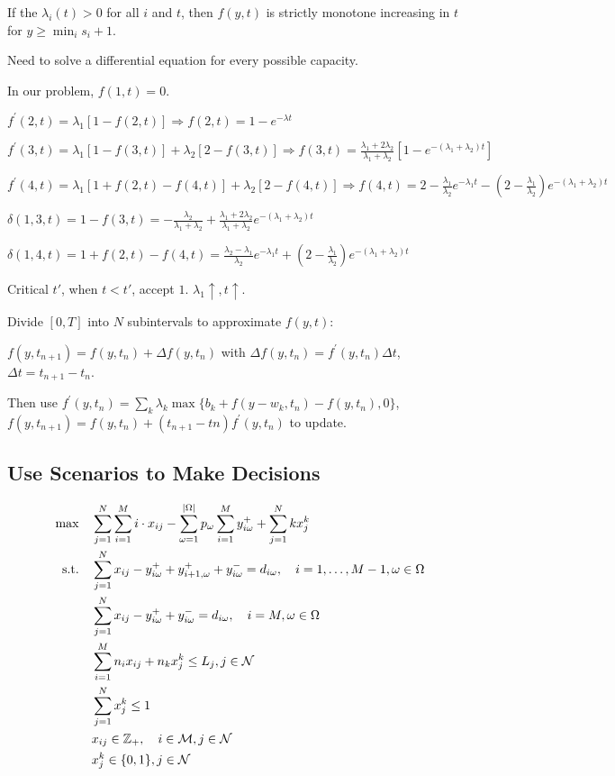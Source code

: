 If the $\lambda_{i}(t) > 0$ for all $i$ and $t$, then $f(y,t)$ is strictly monotone increasing in $t$ for $y \geq \min_{i} s_i +1$.

Need to solve a differential equation for every possible capacity.

In our problem, $f(1,t) = 0$.

$f^{\prime}(2, t) = \lambda_1 [1- f(2,t)] \Rightarrow f(2,t) = 1- e^{-\lambda t}$

$f^{\prime}(3, t) = \lambda_1 [1- f(3,t)] + \lambda_2 [2 - f(3,t)] \Rightarrow f(3,t) = \frac{\lambda_1 + 2 \lambda_2}{\lambda_1 + \lambda_2} [1- e^{-(\lambda_1 + \lambda_2) t}]$

$f^{\prime}(4, t) = \lambda_1 [1 + f(2,t) - f(4,t)] + \lambda_2 [2 - f(4,t)] \Rightarrow f(4,t) = 2- \frac{\lambda_1}{\lambda_2} e^{-\lambda_1 t} - (2- \frac{\lambda_1}{\lambda_2}) e^{-(\lambda_1 + \lambda_2)t}$

$\delta(1,3,t) = 1- f(3,t) = - \frac{\lambda_2}{\lambda_1 + \lambda_2} + \frac{\lambda_1 + 2 \lambda_2}{\lambda_1 + \lambda_2} e^{-(\lambda_1 + \lambda_2)t}$

$\delta(1,4,t) = 1+ f(2,t) - f(4,t) = \frac{\lambda_2- \lambda_1}{\lambda_2} e^{-\lambda_1 t} + (2- \frac{\lambda_1}{\lambda_2}) e^{-(\lambda_1 + \lambda_2)t}$

Critical $t{'}$, when $t < t{'}$, accept $1$.  $\lambda_1 \uparrow, t \uparrow$.

Divide $[0, T]$ into $N$ subintervals to approximate $f(y,t)$:

$f(y,t_{n+1}) = f(y, t_n) + \Delta f(y, t_n)$ with $\Delta f(y, t_n) = f^{'}(y, t_n) \Delta t$, $\Delta t = t_{n+1} - t_{n}$.

Then use $f^{\prime} (y, t_n) = \sum_k \lambda_k \max\{b_k + f(y-w_k, t_n)- f(y, t_n), 0\}$, $f(y, t_{n+1}) = f(y, t_n) + (t_{n+1} - t{n}) f^{\prime}(y, t_n)$ to update.


\subsection{Use Scenarios to Make Decisions}
\begin{align*}
  \quad \max \quad & \sum_{j =1}^{N} \sum_{i=1}^M i \cdot x_{ij} - \sum_{\omega =1}^{|\Omega|} p_{\omega} \sum_{i = 1}^{M} y_{i \omega}^{+} + \sum_{j=1}^{N} k x_{j}^{k} \\
  \text {s.t.} \quad & \sum_{j= 1}^{N} x_{ij}-y_{i \omega}^{+}+
  y_{i+1, \omega}^{+} + y_{i \omega}^{-}=d_{i \omega}, \quad i = 1,\ldots, M-1, \omega \in \Omega  \\
  & \sum_{j= 1}^{N} x_{ij} -y_{i \omega}^{+}+y_{i \omega}^{-}=d_{i \omega}, \quad i = M, \omega \in \Omega \\
  & \sum_{i=1}^{M} n_{i} x_{ij} + n_{k}x_{j}^{k}  \leq L_j, j \in \mathcal{N} \\
  & \sum_{j=1}^{N} x_{j}^{k} \leq 1 \\
  & x_{ij} \in \mathbb{Z}_{+}, \quad i \in \mathcal{M}, j \in \mathcal{N} \notag \\
  & x_{j}^{k} \in \{0,1\}, j \in \mathcal{N}
\end{align*}
